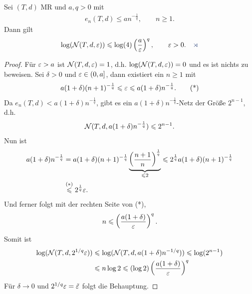 \begin{lem}
\label{prop:4.2.3}
Sei $(T,d)$ MR und $a,q >0$ mit
\begin{align*}
e_n(T,d) \le an^{-\frac{1}{q}},\qquad n\ge 1.
\end{align*}
Dann gilt
\begin{align*}
\log(\NN(T,d,\ep)) \le \log(4)\left(\frac{a}{\ep}\right)^q,\qquad \ep >
0.\fishhere
\end{align*}
\end{lem}
\begin{proof}
Für $\varepsilon > a$ ist $\mathcal{N}(T,d,\varepsilon)=1$, d.h. $\log(\mathcal{N}(T,d,\varepsilon)) = 0$ und es ist
nichts zu beweisen. Sei $\delta > 0$ und $\varepsilon \in (0,a]$, dann existiert ein
$n\ge 1$ mit
\begin{align*}
a(1+\delta)(n+1)^{-\frac{1}{q}} \leqslant \varepsilon \leqslant a(1+\delta)n^{-\frac{1}{q}}.\tag{*}
\end{align*}
Da $e_n(T,d) < a(1+\delta)n^{-\frac{1}{q}}$, gibt es ein
$a(1+\delta)n^{-\frac{1}{q}}$-Netz der Größe $2^{n-1}$, d.h.
\begin{align*}
\mathcal{N}(T,d,a(1+\delta)n^{-\frac{1}{q}}) \leqslant 2^{n-1}.
\end{align*}
Nun ist
\begin{align*}
a(1+\delta)n^{-\frac{1}{q}} &=
a(1+\delta)(n+1)^{-\frac{1}{q}}\underbrace{\left(\frac{n+1}{n}\right)^{\frac{1}{q}}}_{\leqslant
2}
\leqslant 2^{\frac{1}{q}}a(1+\delta)(n+1)^{-\frac{1}{q}}\\
&\overset{(*)}{\leqslant} 2^{\frac{1}{q}}\varepsilon.
\end{align*}
Und ferner folgt mit der rechten Seite von (*),
\begin{align*}
n \leqslant \left(\frac{a(1+\delta)}{\varepsilon}\right)^q.
\end{align*}
Somit ist
\begin{align*}
\log(\mathcal{N}(T,d,2^{1/q}\varepsilon))&\leqslant 
\log(\mathcal{N}(T,d,a(1+\delta)n^{-1/q}))
\leqslant \log(2^{n-1})\\
& \leqslant n \log 2
\leqslant (\log2)\left(\frac{a(1+\delta)}{\varepsilon}\right)^q 
\end{align*}
Für $\delta \to 0$ und $2^{1/q}\varepsilon = \tilde{\varepsilon}$ folgt die Behauptung.\qedhere
\end{proof}

